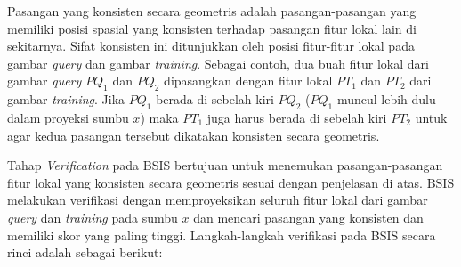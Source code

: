 Pasangan yang konsisten secara geometris adalah pasangan-pasangan yang memiliki posisi spasial yang konsisten terhadap pasangan fitur lokal lain di sekitarnya. Sifat konsisten ini ditunjukkan oleh posisi fitur-fitur lokal pada gambar \textit{query} dan gambar \textit{training}. Sebagai contoh, dua buah fitur lokal dari gambar \textit{query} $PQ_1$ dan $PQ_2$ dipasangkan dengan fitur lokal $PT_1$ dan $PT_2$ dari gambar \textit{training}. Jika $PQ_1$ berada di sebelah kiri $PQ_2$ ($PQ_1$ muncul lebih dulu dalam proyeksi sumbu $x$) maka $PT_1$ juga harus berada di sebelah kiri $PT_2$ untuk agar kedua pasangan tersebut dikatakan konsisten secara geometris.

Tahap \textit{Verification} pada BSIS bertujuan untuk menemukan pasangan-pasangan fitur lokal yang konsisten secara geometris sesuai dengan penjelasan di atas. BSIS melakukan verifikasi dengan memproyeksikan seluruh fitur lokal dari gambar \textit{query} dan \textit{training} pada sumbu $x$ dan mencari pasangan yang konsisten dan memiliki skor yang paling tinggi. Langkah-langkah verifikasi pada BSIS secara rinci adalah sebagai berikut:
